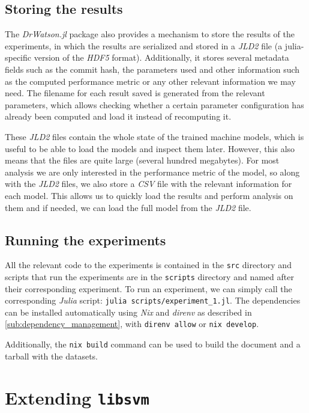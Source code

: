 \subsection{Storing the results}

The \emph{DrWatson.jl} package also provides a mechanism to store the results of the experiments, in
which the results are serialized and stored in a \emph{JLD2} file (a julia-specific version of the \emph{HDF5} format).
Additionally, it stores several metadata fields such as the commit hash, the parameters used and other
information such as the computed performance metric or any other relevant information we may need.
The filename for each result saved is generated from the relevant parameters, which
allows checking whether a certain parameter configuration has already been computed and load it instead of recomputing it.

These \emph{JLD2} files contain the whole state of the trained machine models, which is useful to be able
to load the models and inspect them later. However, this also means that the files are quite large (several
hundred megabytes). For most analysis we are only interested in the performance metric of the model, so
along with the \emph{JLD2} files, we also store a \emph{CSV} file with the relevant information for each
model. This allows us to quickly load the results and perform analysis on them and if needed, we can load
the full model from the \emph{JLD2} file.

\subsection{Running the experiments}

All the relevant code to the experiments is contained in the \texttt{src} directory and scripts
that run the experiments are in the \texttt{scripts} directory and named after their corresponding
experiment. To run an experiment, we can simply call the corresponding \emph{Julia} script:
\texttt{julia scripts/experiment_1.jl}. The dependencies can be installed automatically
using \emph{Nix} and \emph{direnv} as described in \cref{sub:dependency_management}, with
\texttt{direnv allow} or \texttt{nix develop}.

Additionally, the \texttt{nix build} command can be used to build the document
and a tarball with the datasets.

\section{Extending \texttt{libsvm}}%
\label{sub:impl_c}

